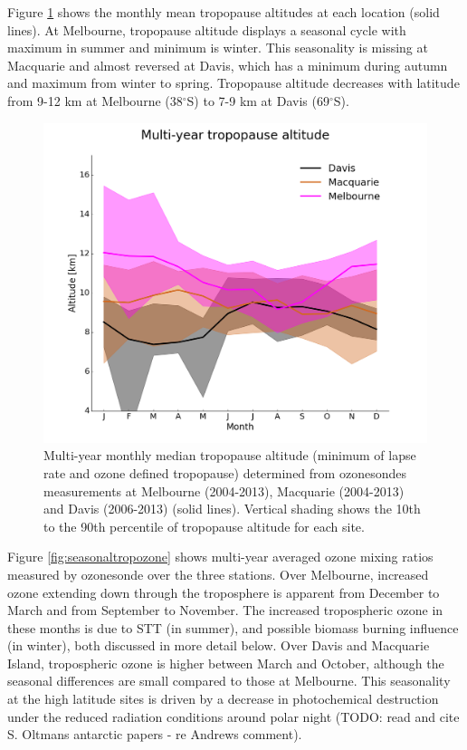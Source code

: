 \documentclass{article}
\begin{document}
    Figure \ref{fig:seasonaltpheights} shows the monthly mean tropopause altitudes at each location (solid lines).
    At Melbourne, tropopause altitude displays a seasonal cycle with maximum in summer and minimum is winter.
    This seasonality is missing at Macquarie and almost reversed at Davis, which has a minimum during autumn and maximum from winter to spring.
    Tropopause altitude decreases with latitude from 9-12 km at Melbourne (38$^\circ$S) to 7-9 km at Davis (69$^\circ$S).

    \begin{figure}[!htbp] \begin{center}
      \includegraphics[width=0.8\columnwidth]{figures/tpheights}
      \caption{Multi-year monthly median tropopause altitude (minimum of lapse rate and ozone defined tropopause) determined from ozonesondes measurements at Melbourne (2004-2013), Macquarie (2004-2013) and Davis (2006-2013) (solid lines).
      Vertical shading shows the 10th to the 90th percentile of tropopause altitude for each site.
      }
      \label{fig:seasonaltpheights}
    \end{center} \end{figure}

    Figure \ref{fig:seasonaltropozone} shows multi-year averaged ozone mixing ratios measured by ozonesonde over the three stations.
    Over Melbourne, increased ozone extending down through the troposphere is apparent from December to March and from September to November.
    The increased tropospheric ozone in these months is due to STT (in summer), and possible biomass burning influence (in winter), both discussed in more detail below.
    Over Davis and Macquarie Island, tropospheric ozone is higher between March and October, although the seasonal differences are small compared to those at Melbourne.
    This seasonality at the high latitude sites is driven by a decrease in photochemical destruction under the reduced radiation conditions around polar night (TODO: read and cite S. Oltmans antarctic papers - re Andrews comment).
    
\end{document}
